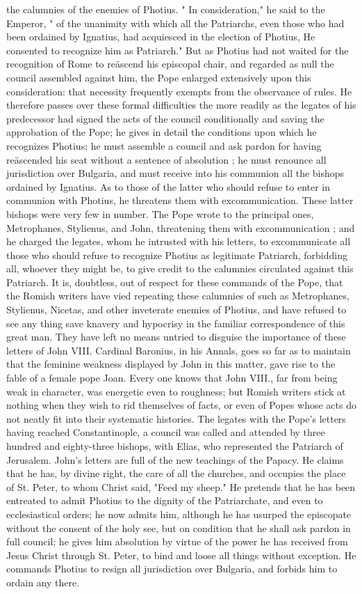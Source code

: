 the calumnies of the enemies of Photius. " In consideration," he said to the Emperor, " of the unanimity with which all the Patriarchs, even those who had been ordained by Ignatius, had acquiesced in the election of Photius, He consented to recognize him as Patriarch." But as Photius had not waited for the recognition of Rome to reäscend his episcopal chair, and regarded as null the council assembled against him, the Pope enlarged extensively upon this consideration: that necessity frequently exempts from the observance of rules. He therefore passes over these formal difficulties the more readily as the legates of his predecessor had signed the acts of the council conditionally and saving the approbation of the Pope; he gives in detail the conditions upon which he recognizes Photius; he must assemble a council and ask pardon for having reäscended his seat without a sentence of absolution ; he must renounce all jurisdiction over Bulgaria, and must receive into his communion all the bishops ordained by Ignatius. As to those of the latter who should refuse to enter in communion with Photius, he threatens them with excommunication. These latter bishops were very few in number. The Pope wrote to the principal ones, Metrophanes, Stylienus, and John, threatening them with excommunication ; and he charged the legates, whom he intrusted with his letters, to excommunicate all those who should refuse to recognize Photius as legitimate Patriarch, forbidding all, whoever they might be, to give credit to the calumnies circulated against this Patriarch. It is, doubtless, out of respect for these commands of the Pope, that the Romish writers have vied repeating these calumnies of such as Metrophanes, Stylienus, Nicetas, and other inveterate enemies of Photius, and have refused to see any thing save knavery and hypocrisy in the familiar correspondence of this great man. They have left no means untried to disguise the importance of these letters of John VIII. Cardinal Baronius, in his Annals, goes so far as to maintain that the feminine weakness displayed by John in this matter, gave rise to the fable of a female pope Joan. Every one knows that John VIII., far from being weak in character, was energetic even to roughness; but Romish writers stick at nothing when they wish to rid themselves of facts, or even of Popes whose acts do not neatly fit into their systematic histories. The legates with the Pope's letters having reached Constantinople, a council was called and attended by three hundred and eighty-three bishops, with Elias, who represented the Patriarch of Jerusalem. John's letters are full of the new teachings of the Papacy. He claims that he has, by divine right, the care of all the churches, and occupies the place of St. Peter, to whom Christ said, "Feed my sheep." He pretends that he has been entreated to admit Photius to the dignity of the Patriarchate, and even to ecclesiastical orders; he now admits him, although he has usurped the episcopate without the consent of the holy see, but on condition that he shall ask pardon in full council; he gives him absolution by virtue of the power he has received from Jesus Christ through St. Peter, to bind and loose all things without exception. He commands Photius to resign all jurisdiction over Bulgaria, and forbids him to ordain any there. 